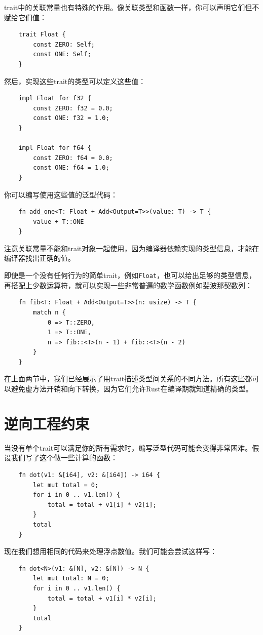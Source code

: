 trait中的关联常量也有特殊的作用。像关联类型和函数一样，你可以声明它们但不赋给它们值：
\begin{verbatim}
    trait Float {
        const ZERO: Self;
        const ONE: Self;
    }
\end{verbatim}

然后，实现这些trait的类型可以定义这些值：
\begin{verbatim}
    impl Float for f32 {
        const ZERO: f32 = 0.0;
        const ONE: f32 = 1.0;
    }

    impl Float for f64 {
        const ZERO: f64 = 0.0;
        const ONE: f64 = 1.0;
    }
\end{verbatim}

你可以编写使用这些值的泛型代码：
\begin{verbatim}
    fn add_one<T: Float + Add<Output=T>>(value: T) -> T {
        value + T::ONE
    }
\end{verbatim}

注意关联常量不能和trait对象一起使用，因为编译器依赖实现的类型信息，才能在编译器找出正确的值。

即使是一个没有任何行为的简单trait，例如\texttt{Float}，也可以给出足够的类型信息，再搭配上少数运算符，就可以实现一些非常普遍的数学函数例如斐波那契数列：
\begin{verbatim}
    fn fib<T: Float + Add<Output=T>>(n: usize) -> T {
        match n {
            0 => T::ZERO,
            1 => T::ONE,
            n => fib::<T>(n - 1) + fib::<T>(n - 2)
        }
    }
\end{verbatim}

在上面两节中，我们已经展示了用trait描述类型间关系的不同方法。所有这些都可以避免虚方法开销和向下转换，因为它们允许Rust在编译期就知道精确的类型。

\section{逆向工程约束}

当没有单个trait可以满足你的所有需求时，编写泛型代码可能会变得非常困难。假设我们写了这个做一些计算的函数：
\begin{verbatim}
    fn dot(v1: &[i64], v2: &[i64]) -> i64 {
        let mut total = 0;
        for i in 0 .. v1.len() {
            total = total + v1[i] * v2[i];
        }
        total
    }
\end{verbatim}

现在我们想用相同的代码来处理浮点数值。我们可能会尝试这样写：
\begin{verbatim}
    fn dot<N>(v1: &[N], v2: &[N]) -> N {
        let mut total: N = 0;
        for i in 0 .. v1.len() {
            total = total + v1[i] * v2[i];
        }
        total
    }
\end{verbatim}

